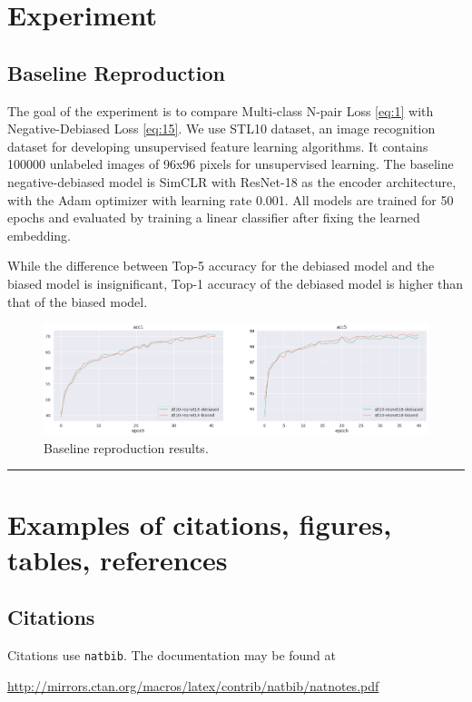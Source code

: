 \documentclass{article}
\begin{document}
\section{Experiment}
\subsection{Baseline Reproduction}

The goal of the experiment is to compare Multi-class N-pair Loss \ref{eq:1} with Negative-Debiased Loss \ref{eq:15}. We use STL10 \citep{pmlr-v15-coates11a} dataset, an image recognition dataset for developing unsupervised feature learning algorithms. It contains 100000 unlabeled images of 96x96 pixels for unsupervised learning. The baseline negative-debiased model is SimCLR \citep{Chen2020SimCLR} with ResNet-18 \citep{7780459} as the encoder architecture, with the Adam optimizer \citep{Diederik2014Adam} with learning rate 0.001. All models are trained for 50 epochs and evaluated by training a linear classifier after fixing the learned embedding.

 While the difference between Top-5 accuracy for the debiased model and the biased model is insignificant, Top-1 accuracy of the debiased model is higher than that of the biased model. 

\begin{figure}
	\centering
	\includegraphics[width=1\textwidth]{figures/acc.png}
	\caption{Baseline reproduction results.}
	\label{fig:fig1}
\end{figure}


\noindent\rule{16cm}{0.4pt}


\section{Examples of citations, figures, tables, references}
\label{sec:others}

\subsection{Citations}
Citations use \verb+natbib+. The documentation may be found at
\begin{center}
	\url{http://mirrors.ctan.org/macros/latex/contrib/natbib/natnotes.pdf}
\end{center}
\end{document}
